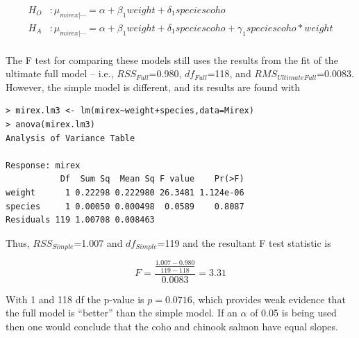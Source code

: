 \documentclass[10pt,openany]{book}\usepackage[]{graphicx}\usepackage[]{color}
\makeatletter
\newenvironment{kframe}{%
 \def\at@end@of@kframe{}%
 \ifinner\ifhmode%
  \def\at@end@of@kframe{\end{minipage}}%
  \begin{minipage}{\columnwidth}%
 \fi\fi%
 \def\FrameCommand##1{\hskip\@totalleftmargin \hskip-\fboxsep
 \colorbox{shadecolor}{##1}\hskip-\fboxsep
     \hskip-\linewidth \hskip-\@totalleftmargin \hskip\columnwidth}%
 \MakeFramed {\advance\hsize-\width
   \@totalleftmargin\z@ \linewidth\hsize
   \@setminipage}}%
 {\par\unskip\endMakeFramed%
 \at@end@of@kframe}
\newenvironment{knitrout}{}{} %
\makeatother
\begin{document}
\[ \begin{split}
  H_{O}&: \mu_{mirex|\cdots} = \alpha+\beta_{1}weight+\delta_{1}speciescoho \\
  H_{A}&: \mu_{mirex|\cdots} = \alpha+\beta_{1}weight+\delta_{1}speciescoho+\gamma_{1}speciescoho*weight \\
\end{split} \]

The F test for comparing these models still uses the results from the fit of the ultimate full model -- i.e., $RSS_{Full}$=0.980, $df_{Full}$=118, and $RMS_{Ultimate Full}$=0.0083.  However, the simple model is different, and its results are found with

\begin{knitrout}
\color{fgcolor}\begin{kframe}
\begin{verbatim}
> mirex.lm3 <- lm(mirex~weight+species,data=Mirex)
> anova(mirex.lm3)
Analysis of Variance Table

Response: mirex
           Df  Sum Sq  Mean Sq F value    Pr(>F)
weight      1 0.22298 0.222980 26.3481 1.124e-06
species     1 0.00050 0.000498  0.0589    0.8087
Residuals 119 1.00708 0.008463                  
\end{verbatim}
\end{kframe}
\end{knitrout}

Thus, $RSS_{Simple}$=1.007 and $df_{Simple}$=119 and the resultant F test statistic is

\[ F = \frac{\frac{1.007-0.980}{119-118}}{0.0083} = 3.31 \]

With 1 and 118 df the p-value is $p=0.0716$, which provides weak evidence that the full model is ``better'' than the simple model.  If an $\alpha$ of 0.05 is being used then one would conclude that the coho and chinook salmon have equal slopes.


\vspace{-12pt}
\end{document}
